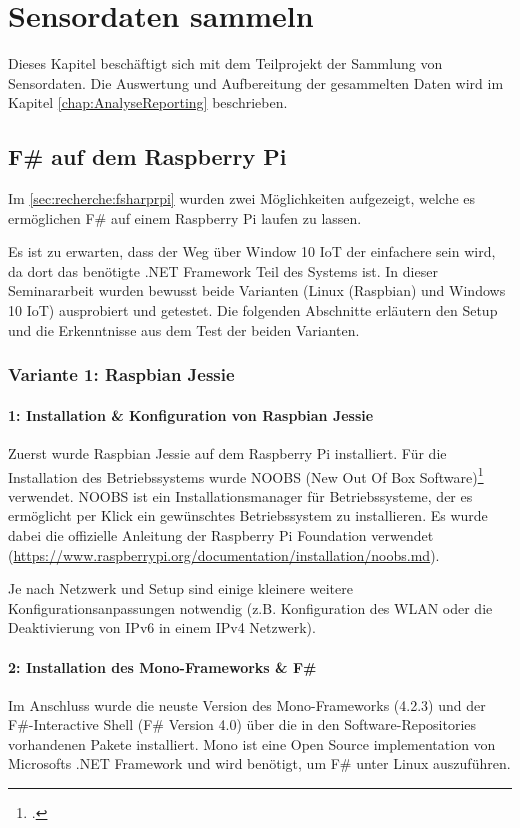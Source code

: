 
\chapter{Sensordaten sammeln}
Dieses Kapitel beschäftigt sich mit dem Teilprojekt der Sammlung von Sensordaten. Die Auswertung und Aufbereitung der gesammelten Daten wird im Kapitel \ref{chap:AnalyseReporting}  beschrieben.


\section{F\# auf dem Raspberry Pi}
Im \cref{sec:recherche:fsharprpi}  wurden zwei Möglichkeiten aufgezeigt, welche es ermöglichen F\# auf einem Raspberry Pi laufen zu lassen.

Es ist zu erwarten, dass der Weg über Window 10 IoT der einfachere sein wird, da dort das benötigte .NET Framework Teil des Systems ist. In dieser Seminararbeit wurden bewusst beide Varianten (Linux (Raspbian) und Windows 10 IoT) ausprobiert und getestet. Die folgenden Abschnitte erläutern den Setup und die Erkenntnisse aus dem Test der beiden Varianten. 

\subsection{Variante 1: Raspbian Jessie}
\subsubsection{1: Installation \& Konfiguration von Raspbian Jessie}
\label{sec:collect:fsharp:variant1:installation}
Zuerst wurde Raspbian Jessie auf dem Raspberry Pi installiert. Für die Installation des Betriebssystems wurde NOOBS (New Out Of Box Software)\footcite{NOOBS_2016-04-25} verwendet. NOOBS ist ein Installationsmanager für Betriebssysteme, der es ermöglicht per Klick ein gewünschtes Betriebssystem zu installieren. Es wurde dabei die offizielle  Anleitung der Raspberry Pi Foundation verwendet (\url{https://www.raspberrypi.org/documentation/installation/noobs.md}).

Je nach Netzwerk und Setup sind einige kleinere weitere Konfigurationsanpassungen notwendig (z.B. Konfiguration des WLAN oder die Deaktivierung von IPv6 in einem IPv4 Netzwerk).


\subsubsection{2: Installation des Mono-Frameworks \& F\#}
\label{sec:collect:fsharp:variant1:mono}
Im Anschluss wurde die neuste Version des Mono-Frameworks (4.2.3) und der F\#-Interactive Shell (F\# Version 4.0) über die in den Software-Repositories vorhandenen Pakete installiert. Mono ist eine Open Source implementation von Microsofts .NET Framework und wird benötigt, um F\# unter Linux auszuführen.

